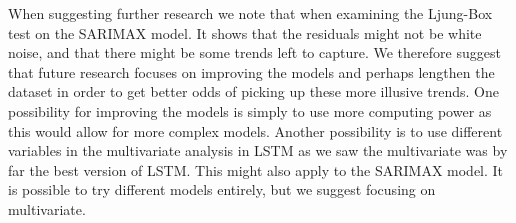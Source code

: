 When suggesting further research we note that when
examining the Ljung-Box test on the SARIMAX model. It shows that the residuals might not be white noise, and that there might be some trends left to capture. We therefore suggest that future research focuses on improving the models and perhaps lengthen the dataset in order to get better odds of picking up these more illusive trends. One possibility for improving the models is simply to use more computing power as this would allow for more complex models. Another possibility is to use different variables in the multivariate analysis in LSTM as we saw the multivariate was by far the best version of LSTM. This might also apply to the SARIMAX model. It is possible to try different models entirely, but we suggest focusing on multivariate.